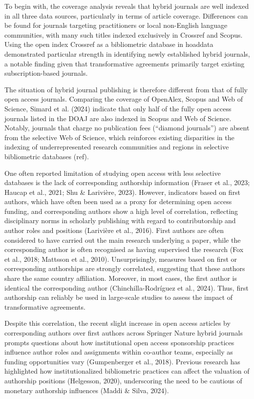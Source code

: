 \documentclass[a4paper,man,floatsintext,longtable,noextraspace,10pt]{apa6}
\begin{document}
To begin with, the coverage analysis reveals that hybrid journals are
well indexed in all three data sources, particularly in terms of article
coverage. Differences can be found for journals targeting practitioners
or local non-English language communities, with many such titles indexed
exclusively in Crossref and Scopus. Using the open index Crossref as a
bibliometric database in hoaddata demonstrated particular strength in
identifying newly established hybrid journals, a notable finding given
that transformative agreements primarily target existing
subscription-based journals.

The situation of hybrid journal publishing is therefore different from
that of fully open access journals. Comparing the coverage of OpenAlex,
Scopus and Web of Science, Simard et al. (2024) indicate that only half
of the fully open access journals listed in the DOAJ are also indexed in
Scopus and Web of Science. Notably, journals that charge no publication
fees (``diamond journals'') are absent from the selective Web of
Science, which reinforces existing disparities in the indexing of
underrepresented research communities and regions in selective
bibliometric databases (ref).

One often reported limitation of studying open access with less
selective databases is the lack of corresponding authorship information
(Fraser et al., 2023; Haucap et al., 2021; Shu \& Larivière, 2023).
However, indicators based on first authors, which have often been used
as a proxy for determining open access funding, and corresponding
authors show a high level of correlation, reflecting disciplinary norms
in scholarly publishing with regard to contributorship and author roles
and positions (Larivière et al., 2016). First authors are often
considered to have carried out the main research underlying a paper,
while the corresponding author is often recognised as having supervised
the research (Fox et al., 2018; Mattsson et al., 2010). Unsurprisingly,
measures based on first or corresponding authorships are strongly
correlated, suggesting that these authors share the same country
affiliation. Moreover, in most cases, the first author is identical the
corresponding author (Chinchilla-Rodríguez et al., 2024). Thus, first
authorship can reliably be used in large-scale studies to assess the
impact of transformative agreements.

Despite this correlation, the recent slight increase in open access
articles by corresponding authors over first authors across Springer
Nature hybrid journals prompts questions about how institutional open
access sponsorship practices influence author roles and assignments
within co-author teams, especially as funding opportunities vary
(Gumpenberger et al., 2018). Previous research has highlighted how
institutionalized bibliometric practices can affect the valuation of
authorship positions (Helgesson, 2020), underscoring the need to be
cautious of monetary authorship influences (Maddi \& Silva, 2024).
\end{document}
